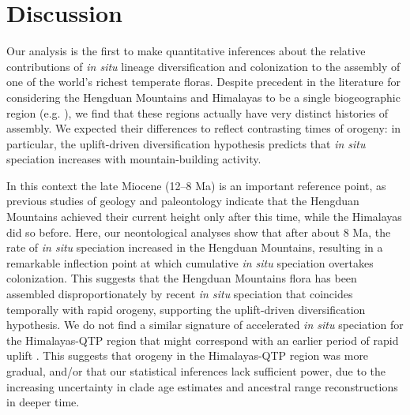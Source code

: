 \section{Discussion}

Our analysis is the first to make quantitative inferences about the relative contributions of \textit{in situ} lineage diversification and colonization to the assembly of one of the world's richest temperate floras. Despite precedent in the literature for considering the Hengduan Mountains and Himalayas to be a single biogeographic region (e.g. \citealt{Zhang2014,Nie2013,GaoY2013,Matuszak2016}), we find that these regions actually have very distinct histories of assembly. We expected their differences to reflect contrasting times of orogeny: in particular, the uplift-driven diversification hypothesis predicts that \textit{in situ} speciation increases with mountain-building activity.

In this context the late Miocene (12--8 Ma) is an important reference point, as previous studies of geology and paleontology indicate that the Hengduan Mountains achieved their current height only after this time, while the Himalayas did so before. Here, our neontological analyses show that after about 8 Ma, the rate of \textit{in situ} speciation increased in the Hengduan Mountains, resulting in a remarkable inflection point at which cumulative \textit{in situ} speciation overtakes colonization. This suggests that the Hengduan Mountains flora has been assembled disproportionately by recent \textit{in situ} speciation that coincides temporally with rapid orogeny, supporting the uplift-driven diversification hypothesis. We do not find a similar signature of accelerated \textit{in situ} speciation for the Himalayas-QTP region that might correspond with an earlier period of rapid uplift \citep{WangY2007,Mao2010}. This suggests that orogeny in the Himalayas-QTP region was more gradual, and/or that our statistical inferences lack sufficient power, due to the increasing uncertainty in clade age estimates and ancestral range reconstructions in deeper time. %


